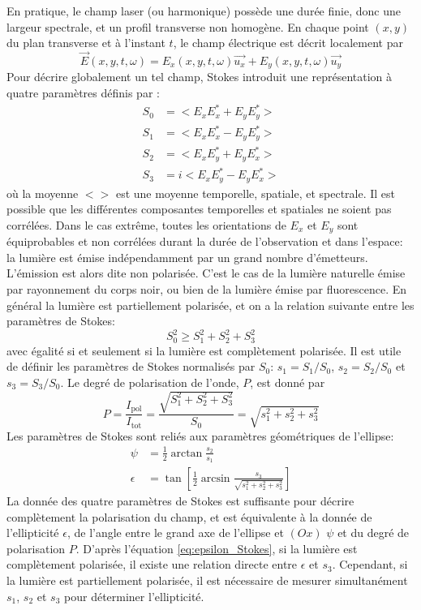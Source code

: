 En pratique, le champ laser (ou harmonique) possède une durée finie, donc une largeur spectrale, et un profil transverse non homogène. En chaque point $(x,y)$ du plan transverse et à l'instant $t$, le champ électrique est décrit localement par
\begin{equation}
\vec{E}(x,y,t,\omega) = E_x(x,y,t,\omega) \vec{u_x} + E_y(x,y,t,\omega) \vec{u_y}
\end{equation}
Pour décrire globalement un tel champ, Stokes introduit une représentation à quatre paramètres définis par :
\begin{align}
S_0 & = <E_x E_x^* + E_y E_y^*> \\
S_1 & = <E_x E_x^* - E_y E_y^*> \\
S_2 & = <E_x E_y^* + E_y E_x^*>\\
S_3 & = i <E_x E_y^* - E_y E_x^*>
\end{align}
où la moyenne $< >$ est une moyenne temporelle, spatiale, et spectrale.
Il est possible que les différentes composantes temporelles et spatiales ne soient pas corrélées. Dans le cas extrême, toutes les orientations de $E_x$ et $E_y$ sont équiprobables et non corrélées durant la durée de l'observation et dans l'espace: la lumière est émise indépendamment par un grand nombre d'émetteurs. L'émission est alors dite non polarisée. C'est le cas de la lumière naturelle émise par rayonnement du corps noir, ou bien de la lumière émise par fluorescence. En général la lumière est partiellement polarisée, et on a la relation suivante entre les paramètres de Stokes:
\begin{equation}
S_0^2 \geqslant S_1^2 + S_2^2 + S_3^2
\end{equation}
avec égalité si et seulement si la lumière est complètement polarisée. Il est utile de définir les paramètres de Stokes normalisés par $S_0$: $s_1 = S_1 /S_0$, $s_2 = S_2 /S_0$ et $s_3 = S_3 /S_0$.
Le degré de polarisation de l'onde, $P$, est donné par 
\begin{equation}
P = \frac{I_{\text{pol}}}{I_{\text{tot}}} = \frac{\sqrt{S_1^2 + S_2^2 + S_3^2}}{S_0} = \sqrt{s_1^2 + s_2^2 + s_3^2}
\label{eq:degrépolarisation}
\end{equation}
Les paramètres de Stokes sont reliés aux paramètres géométriques de l'ellipse:
\begin{align}
\psi & = \frac{1}{2} \arctan \frac{s_2}{s_1} \\
\epsilon & = \tan \left[ \frac{1}{2} \arcsin \frac{s_3}{\sqrt{s_1^2 + s_2^2 + s_3^2}} \right]
\label{eq:epsilon_Stokes}
\end{align}
La donnée des quatre paramètres de Stokes est suffisante pour décrire complètement la polarisation du champ, et est équivalente à la donnée de l'ellipticité $\epsilon$, de l'angle entre le grand axe de l'ellipse et $(Ox)$ $\psi$ et du degré de polarisation $P$. D'après l'équation \ref{eq:epsilon_Stokes}, si la lumière est complètement polarisée, il existe une relation directe entre $\epsilon$ et $s_3$. Cependant, si la lumière est partiellement polarisée, il est nécessaire de mesurer simultanément $s_1$, $s_2$ et $s_3$ pour déterminer l'ellipticité.

